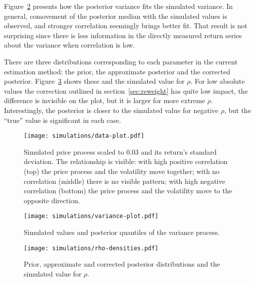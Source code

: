 Figure~\ref{fig:volatility} presents how the posterior variance fits the simulated variance.
In general, comovement of the posterior median with the simulated values is observed, and stronger correlation seemingly brings better fit.
That result is not surprising since there is less information in the directly measured return series about the variance when correlation is low.

There are three distributions corresponding to each parameter in the current estimation method: the prior, the approximate posterior and the corrected posterior.
Figure~\ref{fig:rhodensities} shows these and the simulated value for $\rho$.
For low absolute values the correction outlined in section~\ref{sec:reweight} has quite low impact, the difference is invisible on the plot, but it is larger for more extreme $\rho$.
Interestingly, the posterior is closer to the simulated value for negative $\rho$, but the ``true'' value is significant in each case.

\begin{figure}
	\centering
	\texttt{[image: simulations/data-plot.pdf]}
	\caption[Simulated price process and standard deviation]{Simulated price process scaled to 0.03 and its return's standard deviation. The relationship is visible: with high positive correlation (top) the price process and the volatility move together; with no correlation (middle) there is no visible pattern; with high negative correlation (bottom) the price process and the volatility move to the opposite direction.}
	\label{fig:simdata}
\end{figure}

\begin{figure}
	\centering
	\texttt{[image: simulations/variance-plot.pdf]}
	\caption{Simulated values and posterior quantiles of the variance process.}
	\label{fig:volatility}
\end{figure}

\begin{figure}
	\centering
	\texttt{[image: simulations/rho-densities.pdf]}
	\caption[Prior, approximate and corrected posterior and simulated $\rho$]{Prior, approximate and corrected posterior distributions and the simulated value for $\rho$.}
	\label{fig:rhodensities}
\end{figure}
